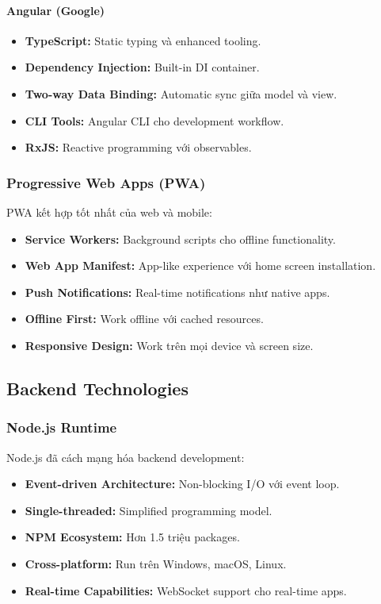 \documentclass[a4paper,12pt]{report}
\begin{document}
\paragraph{Angular (Google)}
\begin{itemize}
    \item \textbf{TypeScript:} Static typing và enhanced tooling.
    \item \textbf{Dependency Injection:} Built-in DI container.
    \item \textbf{Two-way Data Binding:} Automatic sync giữa model và view.
    \item \textbf{CLI Tools:} Angular CLI cho development workflow.
    \item \textbf{RxJS:} Reactive programming với observables.
\end{itemize}

\subsubsection{Progressive Web Apps (PWA)}
PWA kết hợp tốt nhất của web và mobile:
\begin{itemize}
    \item \textbf{Service Workers:} Background scripts cho offline functionality.
    \item \textbf{Web App Manifest:} App-like experience với home screen installation.
    \item \textbf{Push Notifications:} Real-time notifications như native apps.
    \item \textbf{Offline First:} Work offline với cached resources.
    \item \textbf{Responsive Design:} Work trên mọi device và screen size.
\end{itemize}

\subsection{Backend Technologies}

\subsubsection{Node.js Runtime}
Node.js đã cách mạng hóa backend development:
\begin{itemize}
    \item \textbf{Event-driven Architecture:} Non-blocking I/O với event loop.
    \item \textbf{Single-threaded:} Simplified programming model.
    \item \textbf{NPM Ecosystem:} Hơn 1.5 triệu packages.
    \item \textbf{Cross-platform:} Run trên Windows, macOS, Linux.
    \item \textbf{Real-time Capabilities:} WebSocket support cho real-time apps.
\end{itemize}
\end{document}
